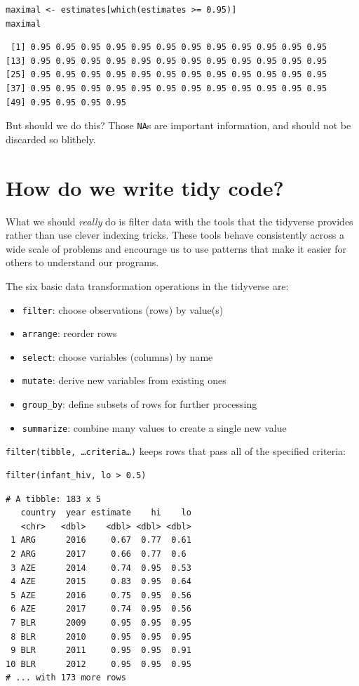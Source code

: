 \begin{lstlisting}
maximal <- estimates[which(estimates >= 0.95)]
maximal
\end{lstlisting}

\begin{lstlisting}
 [1] 0.95 0.95 0.95 0.95 0.95 0.95 0.95 0.95 0.95 0.95 0.95 0.95
[13] 0.95 0.95 0.95 0.95 0.95 0.95 0.95 0.95 0.95 0.95 0.95 0.95
[25] 0.95 0.95 0.95 0.95 0.95 0.95 0.95 0.95 0.95 0.95 0.95 0.95
[37] 0.95 0.95 0.95 0.95 0.95 0.95 0.95 0.95 0.95 0.95 0.95 0.95
[49] 0.95 0.95 0.95 0.95
\end{lstlisting}

But should we do this?
Those \texttt{NA}s are important information,
and should not be discarded so blithely.

\section{How do we write tidy code?}

What we should \emph{really} do is filter data with the tools that the tidyverse provides
rather than use clever indexing tricks.
These tools behave consistently across a wide scale of problems
and encourage us to use patterns that make it easier for others to understand our programs.

The six basic data transformation operations in the tidyverse are:

\begin{itemize}
\item
  \texttt{filter}: choose observations (rows) by value(s)
\item
  \texttt{arrange}: reorder rows
\item
  \texttt{select}: choose variables (columns) by name
\item
  \texttt{mutate}: derive new variables from existing ones
\item
  \texttt{group\_by}: define subsets of rows for further processing
\item
  \texttt{summarize}: combine many values to create a single new value
\end{itemize}

\texttt{filter(tibble, {\ldots}criteria{\ldots})} keeps rows that pass all of the specified criteria:

\begin{lstlisting}
filter(infant_hiv, lo > 0.5)
\end{lstlisting}

\begin{lstlisting}
# A tibble: 183 x 5
   country  year estimate    hi    lo
   <chr>   <dbl>    <dbl> <dbl> <dbl>
 1 ARG      2016     0.67  0.77  0.61
 2 ARG      2017     0.66  0.77  0.6 
 3 AZE      2014     0.74  0.95  0.53
 4 AZE      2015     0.83  0.95  0.64
 5 AZE      2016     0.75  0.95  0.56
 6 AZE      2017     0.74  0.95  0.56
 7 BLR      2009     0.95  0.95  0.95
 8 BLR      2010     0.95  0.95  0.95
 9 BLR      2011     0.95  0.95  0.91
10 BLR      2012     0.95  0.95  0.95
# ... with 173 more rows
\end{lstlisting}

